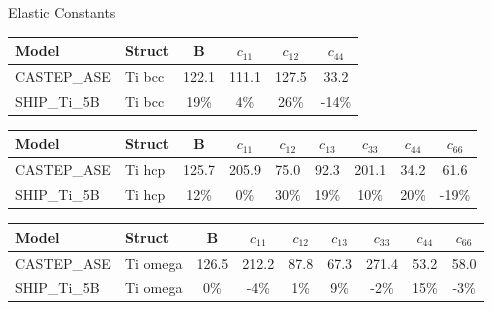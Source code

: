 \documentclass[preview]{standalone}
\begin{document}
\begin{center}
\textnormal{Elastic Constants} \\
\vspace{2mm}
\begin{tabular}{ l l c c c c } \toprule 
Model & Struct & B & $c_{11}$ & $c_{12}$ & $c_{44}$\\ \midrule 
CASTEP\_ASE & Ti bcc & 122.1 & 111.1 & 127.5 & 33.2\\ 
SHIP\_Ti\_5B & Ti bcc & 19\% & 4\% & 26\% & -14\%\\ 
\end{tabular} \bigskip \begin{tabular}{ l l c c c c c c c } \toprule 
Model & Struct & B & $c_{11}$ & $c_{12}$ & $c_{13}$ & $c_{33}$ & $c_{44}$ & $c_{66}$\\ \midrule 
CASTEP\_ASE & Ti hcp & 125.7 & 205.9 & 75.0 & 92.3 & 201.1 & 34.2 & 61.6\\ 
SHIP\_Ti\_5B & Ti hcp & 12\% & 0\% & 30\% & 19\% & 10\% & 20\% & -19\%\\ 
\end{tabular} \bigskip \begin{tabular}{ l l c c c c c c c } \toprule 
Model & Struct & B & $c_{11}$ & $c_{12}$ & $c_{13}$ & $c_{33}$ & $c_{44}$ & $c_{66}$\\ \midrule 
CASTEP\_ASE & Ti omega & 126.5 & 212.2 & 87.8 & 67.3 & 271.4 & 53.2 & 58.0\\ 
SHIP\_Ti\_5B & Ti omega & 0\% & -4\% & 1\% & 9\% & -2\% & 15\% & -3\%\\ 
\end{tabular} \bigskip 
\end{center}
\end{document}

